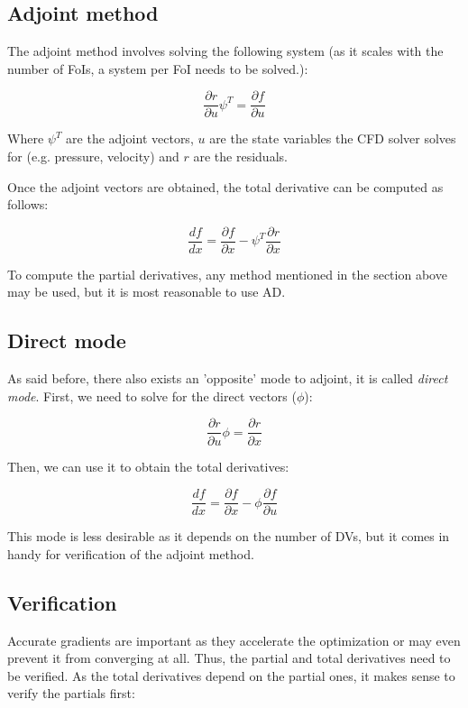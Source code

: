 \subsection{Adjoint method}
The adjoint method involves solving the following system (as it scales with the
number of FoIs, a system per FoI needs to be solved.):

\begin{equation}
    \frac{\partial r}{\partial u} \psi^T = \frac{\partial f}{\partial u}
\end{equation}

\noindent Where $\psi^T$ are the adjoint vectors, $u$ are the state variables
the CFD solver solves for (e.g. pressure, velocity) and $r$ are the residuals.

Once the adjoint vectors are obtained, the total derivative can be computed as
follows:

\begin{equation}
    \frac{df}{dx} = \frac{\partial f}{\partial x} - 
    \psi^T \frac{\partial r}{\partial x}
\end{equation}


\noindent To compute the partial derivatives, any method mentioned in the
section above may be used, but it is most reasonable to use AD. \cite{mdobook}



\subsection{Direct mode}
As said before, there also exists an 'opposite' mode to adjoint, it is called
\textit{direct mode}. First, we need to solve for the direct vectors ($\phi$):

\begin{equation}
    \frac{\partial r}{\partial u} \phi = \frac{\partial r}{\partial x} 
\end{equation}

\noindent Then, we can use it to obtain the total derivatives:

\begin{equation}
    \frac{df}{dx} = \frac{\partial f}{\partial x} -
    \phi \frac{\partial f}{\partial u}
\end{equation}

\noindent This mode is less desirable as it depends on the number of DVs, but
it comes in handy for verification of the adjoint method.




\subsection{Verification}
Accurate gradients are important as they accelerate the optimization or may
even prevent it from converging at all. Thus, the partial and total derivatives
need to be verified. As the total derivatives depend on the partial ones, it
makes sense to verify the partials first:

